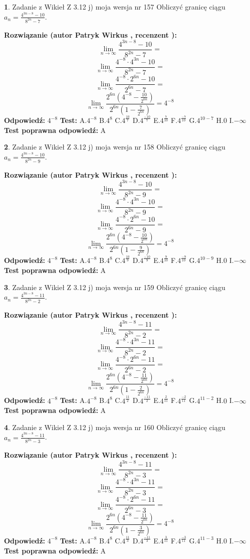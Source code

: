\documentclass[12pt, a4paper]{article}
\theoremstyle{definition} %
\newtheorem{zad}{}
\newcommand{\zadStart}[1]{\begin{zad}#1\newline}
\newcommand{\zadStop}{\end{zad}}
\newcommand{\rozwStart}[2]{\noindent \textbf{Rozwiązanie (autor #1 , recenzent #2): }\newline}
\newcommand{\rozwStop}{\newline}
\newcommand{\odpStart}{\noindent \textbf{Odpowiedź:}\newline}
\newcommand{\odpStop}{\newline}
\newcommand{\testStart}{\noindent \textbf{Test:}\newline}
\newcommand{\testStop}{\newline}
\newcommand{\kluczStart}{\noindent \textbf{Test poprawna odpowiedź:}\newline}
\newcommand{\kluczStop}{\newline}
\begin{document}
\zadStart{Zadanie z Wikieł Z 3.12 j) moja wersja nr 157}
Obliczyć granicę ciągu $a_{n}=\frac{4^{3n-8}-10}{8^{2n}-7}$.
\zadStop
\rozwStart{Patryk Wirkus}{}
$$\lim\limits_{n\to\infty}\frac{4^{3n-8}-10}{8^{2n}-7}=$$
$$\lim\limits_{n\to\infty}\frac{4^{-8} \cdot 4^{3n}-10}{8^{2n}-7}=$$
$$\lim\limits_{n\to\infty}\frac{4^{-8} \cdot 2^{6n}-10}{2^{6n}-7}=$$
$$\lim\limits_{n\to\infty}\frac{2^{6n}(4^{-8} - \frac{10}{2^{6n}})}{2^{6n}(1-\frac{7}{2^{6n}})}= 4^{-8}$$
\rozwStop
\odpStart
$4^{-8}$
\odpStop
\testStart
A.$4^{-8}$
B.$4^{8}$
C.$4^{\frac{10}{7}}$
D.$4^{\frac{-10}{7}}$
E.$4^{\frac{7}{10}}$
F.$4^{\frac{-7}{10}}$
G.$4^{10-7}$
H.$0$
I.$-\infty$
\testStop
\kluczStart
A
\kluczStop



\zadStart{Zadanie z Wikieł Z 3.12 j) moja wersja nr 158}
Obliczyć granicę ciągu $a_{n}=\frac{4^{3n-8}-10}{8^{2n}-9}$.
\zadStop
\rozwStart{Patryk Wirkus}{}
$$\lim\limits_{n\to\infty}\frac{4^{3n-8}-10}{8^{2n}-9}=$$
$$\lim\limits_{n\to\infty}\frac{4^{-8} \cdot 4^{3n}-10}{8^{2n}-9}=$$
$$\lim\limits_{n\to\infty}\frac{4^{-8} \cdot 2^{6n}-10}{2^{6n}-9}=$$
$$\lim\limits_{n\to\infty}\frac{2^{6n}(4^{-8} - \frac{10}{2^{6n}})}{2^{6n}(1-\frac{9}{2^{6n}})}= 4^{-8}$$
\rozwStop
\odpStart
$4^{-8}$
\odpStop
\testStart
A.$4^{-8}$
B.$4^{8}$
C.$4^{\frac{10}{9}}$
D.$4^{\frac{-10}{9}}$
E.$4^{\frac{9}{10}}$
F.$4^{\frac{-9}{10}}$
G.$4^{10-9}$
H.$0$
I.$-\infty$
\testStop
\kluczStart
A
\kluczStop



\zadStart{Zadanie z Wikieł Z 3.12 j) moja wersja nr 159}
Obliczyć granicę ciągu $a_{n}=\frac{4^{3n-8}-11}{8^{2n}-2}$.
\zadStop
\rozwStart{Patryk Wirkus}{}
$$\lim\limits_{n\to\infty}\frac{4^{3n-8}-11}{8^{2n}-2}=$$
$$\lim\limits_{n\to\infty}\frac{4^{-8} \cdot 4^{3n}-11}{8^{2n}-2}=$$
$$\lim\limits_{n\to\infty}\frac{4^{-8} \cdot 2^{6n}-11}{2^{6n}-2}=$$
$$\lim\limits_{n\to\infty}\frac{2^{6n}(4^{-8} - \frac{11}{2^{6n}})}{2^{6n}(1-\frac{2}{2^{6n}})}= 4^{-8}$$
\rozwStop
\odpStart
$4^{-8}$
\odpStop
\testStart
A.$4^{-8}$
B.$4^{8}$
C.$4^{\frac{11}{2}}$
D.$4^{\frac{-11}{2}}$
E.$4^{\frac{2}{11}}$
F.$4^{\frac{-2}{11}}$
G.$4^{11-2}$
H.$0$
I.$-\infty$
\testStop
\kluczStart
A
\kluczStop



\zadStart{Zadanie z Wikieł Z 3.12 j) moja wersja nr 160}
Obliczyć granicę ciągu $a_{n}=\frac{4^{3n-8}-11}{8^{2n}-3}$.
\zadStop
\rozwStart{Patryk Wirkus}{}
$$\lim\limits_{n\to\infty}\frac{4^{3n-8}-11}{8^{2n}-3}=$$
$$\lim\limits_{n\to\infty}\frac{4^{-8} \cdot 4^{3n}-11}{8^{2n}-3}=$$
$$\lim\limits_{n\to\infty}\frac{4^{-8} \cdot 2^{6n}-11}{2^{6n}-3}=$$
$$\lim\limits_{n\to\infty}\frac{2^{6n}(4^{-8} - \frac{11}{2^{6n}})}{2^{6n}(1-\frac{3}{2^{6n}})}= 4^{-8}$$
\rozwStop
\odpStart
$4^{-8}$
\odpStop
\testStart
A.$4^{-8}$
B.$4^{8}$
C.$4^{\frac{11}{3}}$
D.$4^{\frac{-11}{3}}$
E.$4^{\frac{3}{11}}$
F.$4^{\frac{-3}{11}}$
G.$4^{11-3}$
H.$0$
I.$-\infty$
\testStop
\kluczStart
A
\kluczStop
\end{document}

